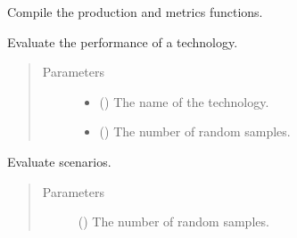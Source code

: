 \documentclass[letterpaper,10pt,english]{sphinxmanual}
\begin{document}
\begin{fulllineitems}
\begin{fulllineitems}
\end{fulllineitems}


\begin{fulllineitems}
\label{\detokenize{doc-src/tyche:tyche.Designs.Designs.compile}}
Compile the production and metrics functions.

\end{fulllineitems}


\begin{fulllineitems}
\label{\detokenize{doc-src/tyche:tyche.Designs.Designs.evaluate}}
Evaluate the performance of a technology.
\begin{quote}\begin{description}
\item[{Parameters}] \leavevmode\begin{itemize}
\item {} 
 () \textendash{} The name of the technology.

\item {} 
 () \textendash{} The number of random samples.

\end{itemize}

\end{description}\end{quote}

\end{fulllineitems}


\begin{fulllineitems}
\label{\detokenize{doc-src/tyche:tyche.Designs.Designs.evaluate_scenarios}}
Evaluate scenarios.
\begin{quote}\begin{description}
\item[{Parameters}] \leavevmode
{} () \textendash{} The number of random samples.


\end{description}
\end{quote}
\end{fulllineitems}
\end{fulllineitems}
\end{document}
